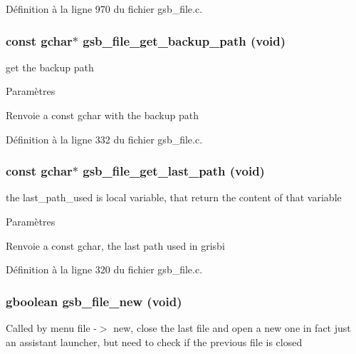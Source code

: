 Définition à la ligne 970 du fichier gsb\_\-file.c.

\subsubsection[{gsb\_\-file\_\-get\_\-backup\_\-path}]{\setlength{\rightskip}{0pt plus 5cm}const gchar$\ast$ gsb\_\-file\_\-get\_\-backup\_\-path (void)}\label{gsb__file_8c_ae0e03d0f99a78e13e6907c6afe498293}
get the backup path


\begin{DoxyParams}{Paramètres}
\item[{\em }]\end{DoxyParams}
\begin{DoxyReturn}{Renvoie}
a const gchar with the backup path 
\end{DoxyReturn}


Définition à la ligne 332 du fichier gsb\_\-file.c.

\subsubsection[{gsb\_\-file\_\-get\_\-last\_\-path}]{\setlength{\rightskip}{0pt plus 5cm}const gchar$\ast$ gsb\_\-file\_\-get\_\-last\_\-path (void)}\label{gsb__file_8c_a05b2359af2cda48c801099a2d222aa55}
the last\_\-path\_\-used is local variable, that return the content of that variable


\begin{DoxyParams}{Paramètres}
\item[{\em }]\end{DoxyParams}
\begin{DoxyReturn}{Renvoie}
a const gchar, the last path used in grisbi 
\end{DoxyReturn}


Définition à la ligne 320 du fichier gsb\_\-file.c.

\subsubsection[{gsb\_\-file\_\-new}]{\setlength{\rightskip}{0pt plus 5cm}gboolean gsb\_\-file\_\-new (void)}\label{gsb__file_8c_a35c7bcb0049be8ba81b58621f30aeaa4}
Called by menu file -\/$>$ new, close the last file and open a new one in fact just an assistant launcher, but need to check if the previous file is closed


